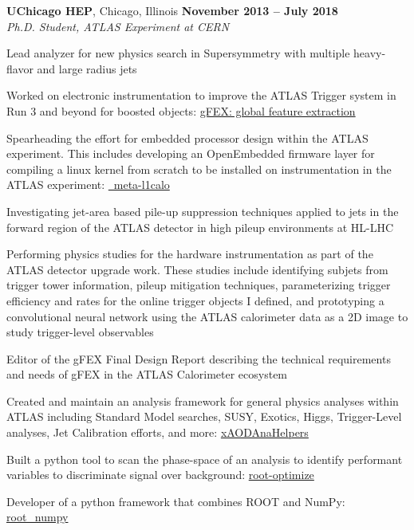 \documentclass[margin,line]{resume}
\begin{document}
\begin{resume}
\textbf{UChicago HEP}, Chicago, Illinois \hfill \textbf{November 2013 -- July 2018}\\
\textsl{Ph.D. Student, ATLAS Experiment at CERN}
\begin{list2}
  \item Lead analyzer for new physics search in Supersymmetry with multiple heavy-flavor and large radius jets \cite{SUSY-2016-10, SUSY-2015-10, ATLAS-CONF-2017-021, ATLAS-CONF-2016-052, ATLAS-CONF-2015-067}
  \item Worked on electronic instrumentation to improve the ATLAS Trigger system in Run 3 and beyond for boosted objects: \href{https://gfex.cern.ch/}{gFEX: global feature extraction} \cite{Tang:2104248, DPF2017gFEX}
  \item Spearheading the effort for embedded processor design within the ATLAS experiment. This includes developing an OpenEmbedded firmware layer for compiling a linux kernel from scratch to be installed on instrumentation in the ATLAS experiment: \href{https://github.com/kratsg/meta-l1calo}{~meta-l1calo}
  \item Investigating jet-area based pile-up suppression techniques applied to jets in the forward region of the ATLAS detector in high pileup environments at HL-LHC \cite{HFSF2017}
  \item Performing physics studies for the hardware instrumentation as part of the ATLAS detector upgrade work. These studies include identifying subjets from trigger tower information, pileup mitigation techniques, parameterizing trigger efficiency and rates for the online trigger objects I defined, and prototyping a convolutional neural network using the ATLAS calorimeter data as a 2D image to study trigger-level observables \cite{DPF2017gFEX}
  \item Editor of the gFEX Final Design Report describing the technical requirements and needs of gFEX in the ATLAS Calorimeter ecosystem \cite{Begel:2233958}
  \item Created and maintain an analysis framework for general physics analyses within ATLAS including Standard Model searches, SUSY, Exotics, Higgs, Trigger-Level analyses, Jet Calibration efforts, and more: \href{https://xaodanahelpers.readthedocs.io/en/master/}{xAODAnaHelpers} \cite{giordon_stark_2015_839037}
  \item Built a python tool to scan the phase-space of an analysis to identify performant variables to discriminate signal over background: \href{https://github.com/kratsg/Optimization}{root-optimize}
  \item Developer of a python framework that combines ROOT and NumPy: \href{http://scikit-hep.org/root_numpy/}{root\_numpy} \cite{Noel_Dawe_2017}
\end{list2}


\end{resume}
\end{document}
